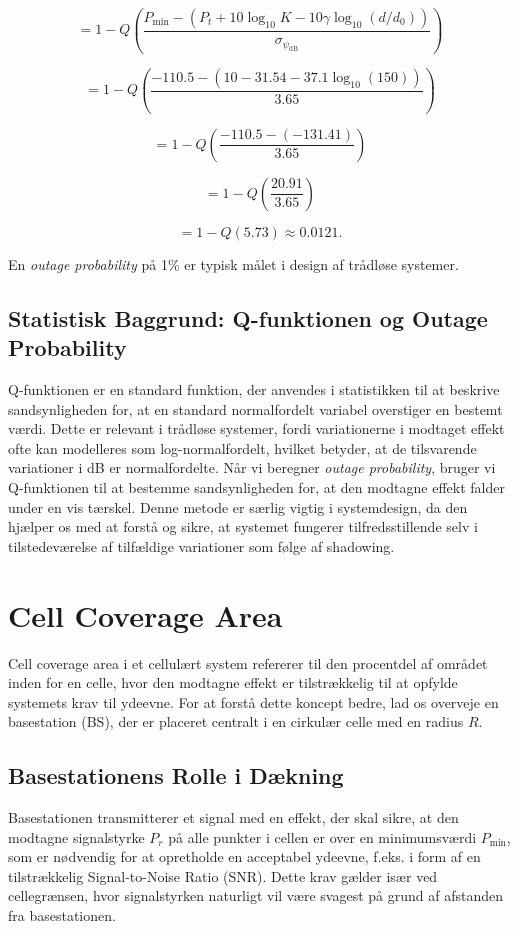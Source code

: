 \documentclass[a4paper,12pt]{book}
\begin{document}
	\[
	= 1 - Q\left(\frac{P_{\text{min}} - \left(P_t + 10 \log_{10} K - 10 \gamma \log_{10}(d/d_0)\right)}{\sigma_{\psi_{\text{dB}}}}\right)
	\]
	
	\[
	= 1 - Q\left(\frac{-110.5 - (10 - 31.54 - 37.1 \log_{10}(150))}{3.65}\right)
	\]
	
	\[
	= 1 - Q\left(\frac{-110.5 - (-131.41)}{3.65}\right)
	\]
	
	\[
	= 1 - Q\left(\frac{20.91}{3.65}\right)
	\]
	
	\[
	= 1 - Q(5.73) \approx 0.0121.
	\]
	
	\noindent En \textit{outage probability} på 1\% er typisk målet i design af trådløse systemer.
	
	\subsection{Statistisk Baggrund: Q-funktionen og Outage Probability}
	Q-funktionen er en standard funktion, der anvendes i statistikken til at beskrive sandsynligheden for, at en standard normalfordelt variabel overstiger en bestemt værdi. Dette er relevant i trådløse systemer, fordi variationerne i modtaget effekt ofte kan modelleres som log-normalfordelt, hvilket betyder, at de tilsvarende variationer i dB er normalfordelte. Når vi beregner \textit{outage probability}, bruger vi Q-funktionen til at bestemme sandsynligheden for, at den modtagne effekt falder under en vis tærskel.
	\newline\newline
	Denne metode er særlig vigtig i systemdesign, da den hjælper os med at forstå og sikre, at systemet fungerer tilfredsstillende selv i tilstedeværelse af tilfældige variationer som følge af shadowing.
	
	\section{Cell Coverage Area}
	\label{sec:cell_coverage}
	
	Cell coverage area i et cellulært system refererer til den procentdel af området inden for en celle, hvor den modtagne effekt er tilstrækkelig til at opfylde systemets krav til ydeevne. For at forstå dette koncept bedre, lad os overveje en basestation (BS), der er placeret centralt i en cirkulær celle med en radius \( R \).
	
	\subsection{Basestationens Rolle i Dækning}
	Basestationen transmitterer et signal med en effekt, der skal sikre, at den modtagne signalstyrke \( P_r \) på alle punkter i cellen er over en minimumsværdi \( P_{\text{min}} \), som er nødvendig for at opretholde en acceptabel ydeevne, f.eks. i form af en tilstrækkelig Signal-to-Noise Ratio (SNR). Dette krav gælder især ved cellegrænsen, hvor signalstyrken naturligt vil være svagest på grund af afstanden fra basestationen.
	
\end{document}
